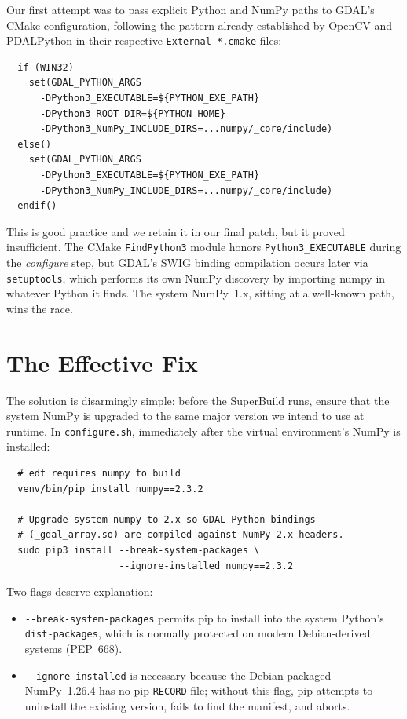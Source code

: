 \documentclass{article}
\begin{document}
Our first attempt was to pass explicit Python and NumPy paths to
GDAL's CMake configuration, following the pattern already established
by OpenCV and PDALPython in their respective \texttt{External-*.cmake}
files:

\begin{verbatim}
  if (WIN32)
    set(GDAL_PYTHON_ARGS
      -DPython3_EXECUTABLE=${PYTHON_EXE_PATH}
      -DPython3_ROOT_DIR=${PYTHON_HOME}
      -DPython3_NumPy_INCLUDE_DIRS=...numpy/_core/include)
  else()
    set(GDAL_PYTHON_ARGS
      -DPython3_EXECUTABLE=${PYTHON_EXE_PATH}
      -DPython3_NumPy_INCLUDE_DIRS=...numpy/_core/include)
  endif()
\end{verbatim}

\noindent This is good practice and we retain it in our final patch, but it
proved insufficient.  The CMake \texttt{FindPython3} module honors
\texttt{Python3\_EXECUTABLE} during the \emph{configure} step, but GDAL's
SWIG binding compilation occurs later via \texttt{setuptools}, which
performs its own NumPy discovery by importing numpy in whatever Python
it finds.  The system NumPy~1.x, sitting at a well-known path, wins
the race.

\section{The Effective Fix}

The solution is disarmingly simple: before the SuperBuild runs, ensure
that the system NumPy is upgraded to the same major version we intend
to use at runtime.  In \texttt{configure.sh}, immediately after the
virtual environment's NumPy is installed:

\begin{verbatim}
  # edt requires numpy to build
  venv/bin/pip install numpy==2.3.2

  # Upgrade system numpy to 2.x so GDAL Python bindings
  # (_gdal_array.so) are compiled against NumPy 2.x headers.
  sudo pip3 install --break-system-packages \
                    --ignore-installed numpy==2.3.2
\end{verbatim}

\noindent Two flags deserve explanation:

\begin{itemize}
  \item \texttt{-{}-break-system-packages} permits pip to install into
    the system Python's \texttt{dist-packages}, which is normally
    protected on modern Debian-derived systems (PEP~668).

  \item \texttt{-{}-ignore-installed} is necessary because the
    Debian-packaged NumPy~1.26.4 has no pip \texttt{RECORD} file; without
    this flag, pip attempts to uninstall the existing version, fails to
    find the manifest, and aborts.
\end{itemize}
\end{document}
